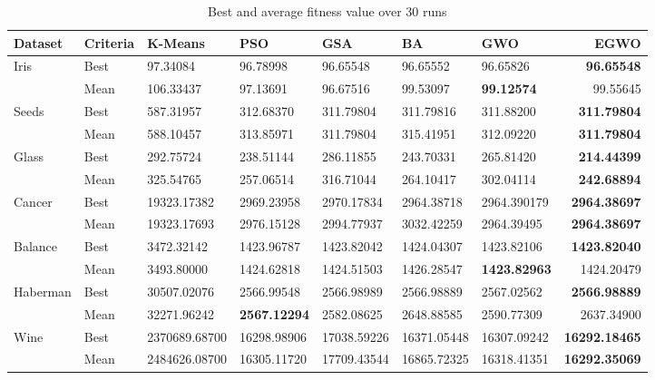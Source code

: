 \documentclass[review]{elsarticle}
\begin{document}
\begin{table}
\caption{Best and average fitness value over 30 runs}
\scriptsize
\begin{center}
\renewcommand{\arraystretch}{1}
  \begin{tabular}{l l l l l l l r}
    
    \hline
\textbf{Dataset} & \textbf{Criteria} 		&		\textbf{K-Means}     &	 \textbf{PSO}  &\textbf{GSA} &\textbf{BA}&\textbf{GWO}&\textbf{EGWO} \\
\hline
Iris	&	Best	&	97.34084	&	96.78998	&	96.65548	&	96.65552	&	96.65826	&	\textbf{96.65548}	\\	
&	Mean	&	106.33437	&	97.13691	&	96.67516	&	99.53097	&	\textbf{99.12574}	&	99.55645	\\
Seeds	&	Best	&	587.31957	&	312.68370	&	311.79804&	311.79816	&	311.88200	&	\textbf{311.79804}	\\	
&	Mean	&	588.10457&	313.85971	&	311.79804	&	315.41951	&	312.09220	&	\textbf{311.79804}	\\
Glass	&	Best	&	292.75724	&	238.51144	&	286.11855	&	243.70331&	265.81420	&	\textbf{214.44399}	\\	
&	Mean	&	325.54765	&	257.06514	&	316.71044	&	264.10417	&	302.04114	&	\textbf{242.68894}	\\
Cancer	&	Best	&	19323.17382	&	2969.23958&	2970.17834	&	2964.38718	&	2964.390179	&	\textbf{2964.38697}	\\	
&	Mean	&	19323.17693	&	2976.15128&	2994.77937	&	3032.42259	&	2964.39495	&	\textbf{2964.38697}	\\
Balance	&	Best	&	3472.32142	&	1423.96787	&	1423.82042&	1424.04307	&	1423.82106&	\textbf{1423.82040}	\\	
&	Mean	&	3493.80000	&	1424.62818	&	1424.51503	&	1426.28547	&	\textbf{1423.82963}	&	1424.20479	\\
Haberman	&	Best	&	30507.02076	&	2566.99548&	2566.98989	&	2566.98889	&	2567.02562	&	\textbf{2566.98889}	\\
	&	Mean	&	32271.96242	&	\textbf{2567.12294}	&	2582.08625	&	2648.88585	&	2590.77309	&	2637.34900	\\
Wine	&	Best	&	2370689.68700	&	16298.98906	&	17038.59226	&	16371.05448	&	16307.09242	&	\textbf{16292.18465}	\\	
&	Mean	&	2484626.08700	&	16305.11720	&	17709.43544	&	16865.72325	&	16318.41351	&	\textbf{16292.35069}	\\

    \hline
  \end{tabular}
\end{center}
\label{tab:result}
\end{table}
\end{document}
